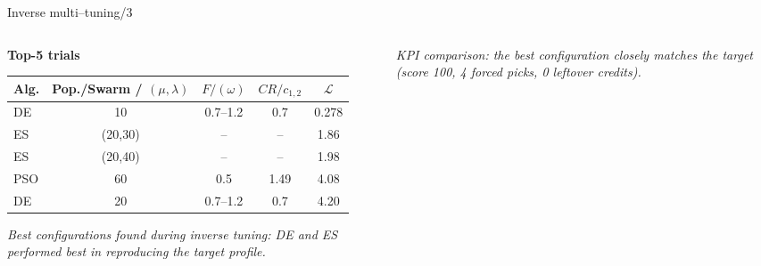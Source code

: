 \documentclass[aspectratio=169]{beamer}
\begin{document}
\begin{frame}{Inverse multi–tuning/3}
	\small
	\vspace{1ex}
	\centering
	
	\begin{columns}[T,onlytextwidth]
		\begin{column}{.55\linewidth}
			\textbf{Top-5 trials}\par\medskip
			\footnotesize
			\begin{tabular}{@{}lcccc@{}}
				\toprule
				Alg. & Pop./Swarm / $(\mu,\lambda)$ & $F/(\omega)$ & $CR/c_{1,2}$ & $\mathcal L$\\
				\midrule
				DE  & 10          & 0.7–1.2 & 0.7  & 0.278\\
				ES  & (20,30)     & –       & –    & 1.86\\
				ES  & (20,40)     & –       & –    & 1.98\\
				PSO & 60          & 0.5     & 1.49 & 4.08\\
				DE  & 20          & 0.7–1.2 & 0.7  & 4.20\\
				\bottomrule
			\end{tabular}
			
			\vspace{1ex}
			\textit{Best configurations found during inverse tuning: DE and ES performed best in reproducing the target profile.}
		\end{column}
		
		\begin{column}{.45\linewidth}
			
			\vspace{1ex}
			\textit{KPI comparison: the best configuration closely matches the target (score 100, 4 forced picks, 0 leftover credits).}
		\end{column}
	\end{columns}
\end{frame}
\end{document}
